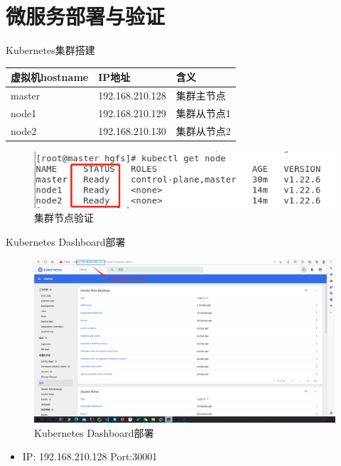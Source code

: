 \documentclass{beamer}
\begin{document}
\section{微服务部署与验证}
\begin{frame}{Kubernetes集群搭建}
\begin{tabular}{|l|l|l|}\hline\hline
	虚拟机hostname        & IP地址&含义              \\ \hline
	master&192.168.210.128&集群主节点\\ \hline
	node1&192.168.210.129& 集群从节点1\\ \hline
	node2&192.168.210.130& 集群从节点2\\ \hline\hline
\end{tabular}
\begin{figure}[htpb]
	\centering
	\includegraphics[width=1.0\linewidth]{pic/getnode.png}
	\caption{集群节点验证}
\end{figure}

\end{frame}

\begin{frame}{Kubernetes Dashboard部署}
\begin{figure}[htpb]
	\centering
	\includegraphics[width=0.9\linewidth]{pic/dashboard.png}
	\caption{Kubernetes Dashboard部署}
\end{figure}
\begin{itemize}
	\item IP: 192.168.210.128 Port:30001
\end{itemize}
\end{frame}
\end{document}
